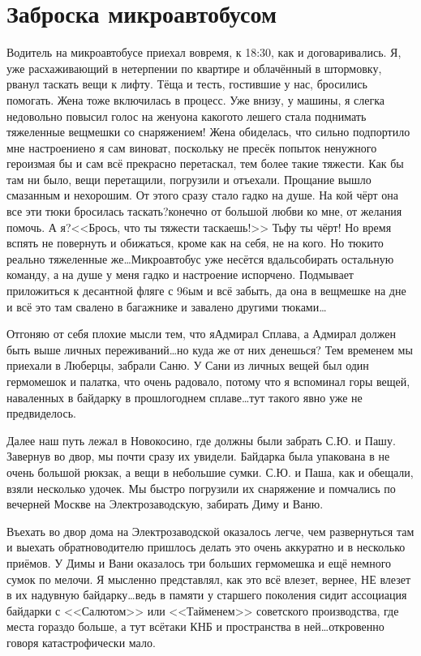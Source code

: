 \chapter{Заброска микроавтобусом} 

Водитель на микроавтобусе приехал вовремя, к 18:30, как и договаривались. Я, уже расхаживающий в нетерпении по квартире и облачённый в штормовку, рванул таскать вещи к лифту. Тёща и тесть, гостившие у нас, бросились помогать. Жена тоже включилась в процесс. Уже внизу, у машины, я слегка недовольно повысил голос на жену\mdash она какого\sdash то лешего стала поднимать тяжеленные вещмешки со снаряжением! Жена обиделась, что сильно подпортило мне настроение\mdash но я сам виноват, поскольку не пресёк попыток ненужного героизма\mdash я бы и сам всё прекрасно перетаскал, тем более такие тяжести. Как бы там ни было, вещи перетащили, погрузили и отъехали. Прощание вышло смазанным и нехорошим. От этого сразу стало гадко на душе. На кой чёрт она все эти тюки бросилась таскать?\mdash конечно от большой любви ко мне, от желания помочь. А я?\mdash  <<Брось, что ты тяжести таскаешь!>> Тьфу ты чёрт! Но время вспять не повернуть и обижаться, кроме как на себя, не на кого. Но тюки\sdash то реально тяжеленные же\ldots Микроавтобус уже несётся вдаль\mdash собирать остальную команду, а на душе у меня гадко и настроение испорчено. Подмывает приложиться к десантной фляге с 96\sdash ым и всё забыть, да она в вещмешке на дне и всё это там свалено в багажнике и завалено другими тюками\ldots 
 
Отгоняю от себя плохие мысли тем, что я\mdash Адмирал Сплава, а Адмирал должен быть выше личных переживаний\ldots  но куда же от них денешься? Тем временем мы приехали в Люберцы, забрали Саню. У Сани из личных вещей был один гермомешок и палатка, что очень радовало, потому что я вспоминал горы вещей, наваленных в байдарку в прошлогоднем сплаве\ldots  тут такого явно уже не предвиделось.  

Далее наш путь лежал в Новокосино, где должны были забрать С.Ю. и Пашу. Завернув во двор, мы почти сразу их увидели. Байдарка была упакована в не очень большой рюкзак, а вещи в небольшие сумки. С.Ю. и Паша, как и обещали, взяли несколько удочек. Мы быстро погрузили их снаряжение и помчались по вечерней Москве на Электрозаводскую, забирать Диму и Ваню. 

Въехать во двор дома на Электрозаводской оказалось легче, чем развернуться там и выехать обратно\mdash водителю пришлось делать это очень аккуратно и в несколько приёмов. У Димы и Вани оказалось три больших гермомешка и ещё немного сумок по мелочи. Я мысленно представлял, как это всё влезет, вернее, НЕ влезет в их надувную байдарку\ldots  ведь в памяти у старшего поколения сидит ассоциация байдарки с <<Салютом>> или <<Тайменем>> советского производства, где места гораздо больше, а тут всё\sdash таки КНБ и пространства в ней\ldots  откровенно говоря катастрофически мало.

